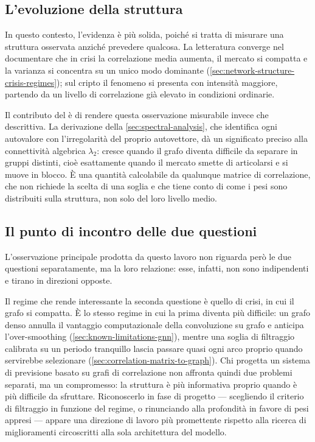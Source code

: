 \subsection*{L'evoluzione della struttura}

In questo contesto, l'evidenza è più solida, poiché si tratta di misurare una struttura osservata anziché prevedere qualcosa. La letteratura converge nel documentare che in crisi la correlazione media aumenta, il mercato si compatta e la varianza si concentra su un unico modo dominante (\cref{sec:network-structure-crisis-regimes}); sul cripto il fenomeno si presenta con intensità maggiore, partendo da un livello di correlazione già elevato in condizioni ordinarie.

Il contributo del  è di rendere questa osservazione misurabile invece che descrittiva. La derivazione della \cref{sec:spectral-analysis}, che identifica ogni autovalore con l'irregolarità del proprio autovettore, dà un significato preciso alla connettività algebrica $\lambda_2$: cresce quando il grafo diventa difficile da separare in gruppi distinti, cioè esattamente quando il mercato smette di articolarsi e si muove in blocco. È una quantità calcolabile da qualunque matrice di correlazione, che non richiede la scelta di una soglia e che tiene conto di come i pesi sono distribuiti sulla struttura, non solo del loro livello medio.

\subsection*{Il punto di incontro delle due questioni}

L'osservazione principale prodotta da questo lavoro non riguarda però le due questioni separatamente, ma la loro relazione: esse, infatti, non sono indipendenti e tirano in direzioni opposte.

Il regime che rende interessante la seconda questione è quello di crisi, in cui il grafo si compatta. È lo stesso regime in cui la prima diventa più difficile: un grafo denso annulla il vantaggio computazionale della convoluzione su grafo e anticipa l'over-smoothing (\cref{sec:known-limitations-gnn}), mentre una soglia di filtraggio calibrata su un periodo tranquillo lascia passare quasi ogni arco proprio quando servirebbe selezionare (\cref{sec:correlation-matrix-to-graph}). Chi progetta un sistema di previsione basato su grafi di correlazione non affronta quindi due problemi separati, ma un compromesso: la struttura è più informativa proprio quando è più difficile da sfruttare. Riconoscerlo in fase di progetto — scegliendo il criterio di filtraggio in funzione del regime, o rinunciando alla profondità in favore di pesi appresi — appare una direzione di lavoro più promettente rispetto alla ricerca di miglioramenti circoscritti alla sola architettura del modello.


